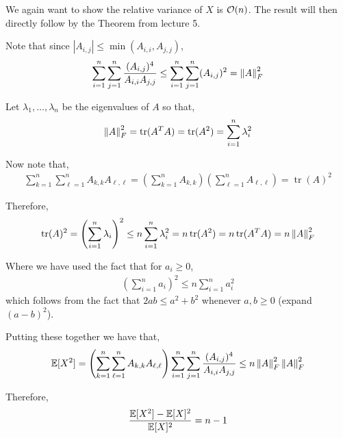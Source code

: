 \documentclass[10pt]{article}
\newcommand{\tr}{\operatorname{tr}}
\begin{document}
\begin{solution}[Solution]
\begin{enumerate}[label=(\alph*)]
        We again want to show the relative variance of \( X \) is \( \mathcal{O}(n) \). The result will then directly follow by the Theorem from lecture 5.


        Note that since \( |A_{i,j}| \leq \min(A_{i,i},A_{j,j}) \),
        \begin{align*}
           \sum_{i=1}^{n} \sum_{j=1}^{n} \frac{(A_{i,j})^4}{A_{i,i}A_{j,j}} 
            \leq \sum_{i=1}^{n} \sum_{j=1}^{n} (A_{i,j})^2
            = \left\lVert A\right\rVert_F^2
        \end{align*}
        

        Let \( \lambda_1,\ldots,\lambda_n \) be the eigenvalues of \( A \) so that,
        \begin{align*}
            \norm{A}_F^2 = \tr(A^TA) = \tr(A^2) = \sum_{i=1}^{n} \lambda_i^2
        \end{align*}
        

        Now note that,
        \begin{align*}
            \sum_{k=1}^{n} \sum_{\ell=1}^{n} A_{k,k}A_{\ell,\ell} 
            = \left( \sum_{k=1}^{n} A_{k,k} \right) \left( \sum_{\ell=1}^{n} A_{\ell,\ell} \right)
            = \tr(A)^2
        \end{align*}
        
        Therefore,
        \begin{align*}
            \tr(A)^2
            = \left( \sum_{i=1}^{n} \lambda_i \right)^2
            \leq n \sum_{i=1}^{n} \lambda_i^2
            = n\tr(A^2)
            = n\tr(A^TA)
            = n\norm{A}_F^2
        \end{align*}
        
        Where we have used the fact that for \( a_i \geq 0 \),
        \begin{align*}
            \left(\sum_{i=1}^{n} a_i \right)^2 
            \leq n \sum_{i=1}^{n} a_i^2
        \end{align*}
        which follows from the fact that \( 2ab \leq a^2+b^2 \) whenever \( a,b\geq 0 \) (expand \( (a-b)^2 \)).
        
        Putting these together we have that,
        \begin{align*}
            \mathbb{E}[X^2] = 
            \left( \sum_{k=1}^{n} \sum_{\ell=1}^{n} A_{k,k}A_{\ell,\ell} \right)\sum_{i=1}^{n} \sum_{j=1}^{n} \frac{(A_{i,j})^4}{A_{i,i}A_{j,j}}
            \leq n \left\lVert A\right\rVert_F^2 \left\lVert A\right\rVert_F^2
        \end{align*}

        Therefore,
        \begin{align*}
            \frac{\mathbb{E}[X^2]-\mathbb{E}[X]^2}{\mathbb{E}[X]^2} = n - 1
        \end{align*}


\end{enumerate}
\end{solution}
\end{document}
